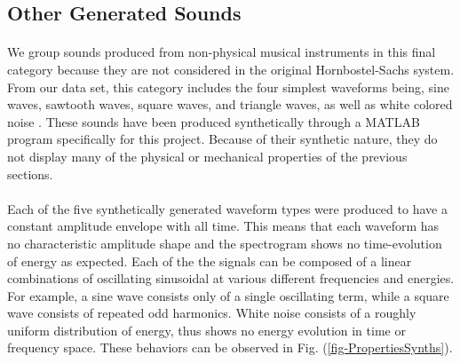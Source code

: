 \documentclass[12pt,letterpaper]{article}
\begin{document}

\subsection{Other Generated Sounds}
\label{subsec-Generated}

\paragraph*{}We group sounds produced from non-physical musical instruments in this final category because they are not considered in the original Hornbostel-Sachs system. From our data set, this category includes the four simplest waveforms being, sine waves, sawtooth waves, square waves, and triangle waves, as well as white colored noise \cite{White}. These sounds have been produced synthetically through a MATLAB program specifically for this project. Because of their synthetic nature, they do not display many of the physical or mechanical properties of the previous sections.

\paragraph*{}Each of the five synthetically generated waveform types were produced to have a constant amplitude envelope with all time. This means that each waveform has no characteristic amplitude shape and the spectrogram shows no time-evolution of energy as expected. Each of the the signals can be composed of a linear combinations of oscillating sinusoidal at various different frequencies and energies. For example, a sine wave consists only of a single oscillating term, while a square wave consists of repeated odd harmonics. White noise consists of a roughly uniform distribution of energy, thus shows no energy evolution in time or frequency space. These behaviors can be observed in Fig. (\ref{fig-PropertiesSynths}).
\end{document}

